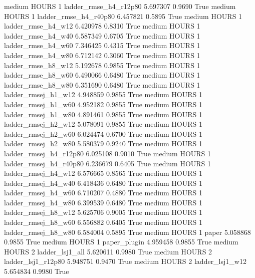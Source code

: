     medium    HOURS                 1  ladder_rmse_h4_r12p80   5.697307      0.9690    True
    medium    HOURS                 1  ladder_rmse_h4_r40p80   6.457821      0.5895    True
    medium    HOURS                 1     ladder_rmse_h4_w12   6.420978      0.8310    True
    medium    HOURS                 1     ladder_rmse_h4_w40   6.587349      0.6705    True
    medium    HOURS                 1     ladder_rmse_h4_w60   7.346425      0.4315    True
    medium    HOURS                 1     ladder_rmse_h4_w80   6.712142      0.3060    True
    medium    HOURS                 1     ladder_rmse_h8_w12   5.192678      0.9855    True
    medium    HOURS                 1     ladder_rmse_h8_w60   6.490066      0.6480    True
    medium    HOURS                 1     ladder_rmse_h8_w80   6.351690      0.6480    True
    medium    HOURS                 1    ladder_rmsej_h1_w12   4.948859      0.9855    True
    medium    HOURS                 1    ladder_rmsej_h1_w60   4.952182      0.9855    True
    medium    HOURS                 1    ladder_rmsej_h1_w80   4.891461      0.9855    True
    medium    HOURS                 1    ladder_rmsej_h2_w12   5.078091      0.9855    True
    medium    HOURS                 1    ladder_rmsej_h2_w60   6.024474      0.6700    True
    medium    HOURS                 1    ladder_rmsej_h2_w80   5.580379      0.9240    True
    medium    HOURS                 1 ladder_rmsej_h4_r12p80   6.025108      0.9010    True
    medium    HOURS                 1 ladder_rmsej_h4_r40p80   6.236679      0.6405    True
    medium    HOURS                 1    ladder_rmsej_h4_w12   6.576665      0.8565    True
    medium    HOURS                 1    ladder_rmsej_h4_w40   6.418436      0.6480    True
    medium    HOURS                 1    ladder_rmsej_h4_w60   6.710207      0.4880    True
    medium    HOURS                 1    ladder_rmsej_h4_w80   6.399539      0.6480    True
    medium    HOURS                 1    ladder_rmsej_h8_w12   5.625706      0.9005    True
    medium    HOURS                 1    ladder_rmsej_h8_w60   6.556882      0.6405    True
    medium    HOURS                 1    ladder_rmsej_h8_w80   6.584004      0.5895    True
    medium    HOURS                 1                  paper   5.058868      0.9855    True
    medium    HOURS                 1           paper_plugin   4.959458      0.9855    True
    medium    HOURS                 2        ladder_lsj1_all   5.620611      0.9980    True
    medium    HOURS                 2     ladder_lsj1_r12p80   5.948751      0.9470    True
    medium    HOURS                 2        ladder_lsj1_w12   5.654834      0.9980    True
